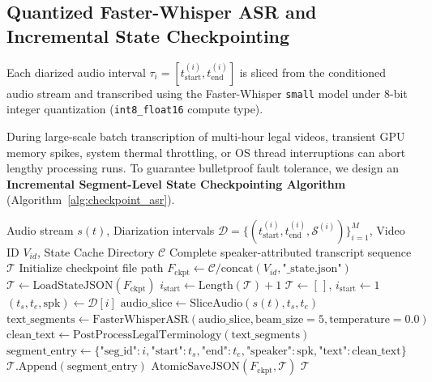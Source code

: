 \documentclass{llncs}
\begin{document}
\subsection{Quantized Faster-Whisper ASR and Incremental State Checkpointing}
Each diarized audio interval $\tau_i = [t_{\text{start}}^{(i)}, t_{\text{end}}^{(i)}]$ is sliced from the conditioned audio stream and transcribed using the Faster-Whisper \texttt{small} model under 8-bit integer quantization (\texttt{int8\_float16} compute type).

During large-scale batch transcription of multi-hour legal videos, transient GPU memory spikes, system thermal throttling, or OS thread interruptions can abort lengthy processing runs. To guarantee bulletproof fault tolerance, we design an \textbf{Incremental Segment-Level State Checkpointing Algorithm} (Algorithm~\ref{alg:checkpoint_asr}).

\begin{algorithm}[htbp]
\caption{Incremental Segment-Level State Checkpointing ASR Pipeline}
\label{alg:checkpoint_asr}
\begin{algorithmic}[1]
\REQUIRE Audio stream $s(t)$, Diarization intervals $\mathcal{D} = \{ (t_{\text{start}}^{(i)}, t_{\text{end}}^{(i)}, \mathcal{S}^{(i)}) \}_{i=1}^M$, Video ID $V_{id}$, State Cache Directory $\mathcal{C}$
\ENSURE Complete speaker-attributed transcript sequence $\mathcal{T}$
\STATE Initialize checkpoint file path $F_{\text{ckpt}} \leftarrow \mathcal{C} / \text{concat}(V_{id}, \text{"\_state.json"})$
    \STATE $\mathcal{T} \leftarrow \text{LoadStateJSON}(F_{\text{ckpt}})$
    \STATE $i_{\text{start}} \leftarrow \text{Length}(\mathcal{T}) + 1$
\ELSE
    \STATE $\mathcal{T} \leftarrow [\,]$, $i_{\text{start}} \leftarrow 1$
\ENDIF
{}
    \STATE $(t_s, t_e, \text{spk}) \leftarrow \mathcal{D}[i]$
    \STATE $\text{audio\_slice} \leftarrow \text{SliceAudio}(s(t), t_s, t_e)$
    \STATE $\text{text\_segments} \leftarrow \text{FasterWhisperASR}(\text{audio\_slice}, \text{beam\_size}=5, \text{temperature}=0.0)$
    \STATE $\text{clean\_text} \leftarrow \text{PostProcessLegalTerminology}(\text{text\_segments})$
    \STATE $\text{segment\_entry} \leftarrow \{ \text{"seg\_id"}: i, \text{"start"}: t_s, \text{"end"}: t_e, \text{"speaker"}: \text{spk}, \text{"text"}: \text{clean\_text} \}$
    \STATE $\mathcal{T}.\text{Append}(\text{segment\_entry})$
    \STATE $\text{AtomicSaveJSON}(F_{\text{ckpt}}, \mathcal{T})$ 
\ENDFOR
\RETURN $\mathcal{T}$
\end{algorithmic}
\end{algorithm}
\end{document}
